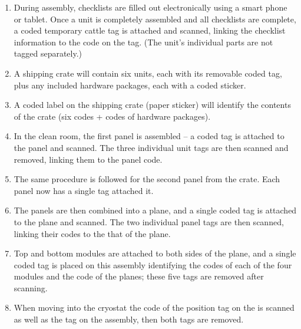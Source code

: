 \begin{enumerate}
\item During assembly,  checklists are filled out electronically using a smart phone or tablet.  Once a  unit 
is completely assembled and all checklists are complete, a coded temporary cattle tag is attached and scanned, linking the checklist information to the code on the tag. (The  unit's individual parts are not tagged separately.)
\item %
A shipping crate will contain six %
 units, each with its removable coded tag, plus any included hardware packages, each with a coded sticker.
\item A coded label on the shipping crate (paper sticker) will %
identify the contents of the crate (six codes + codes of hardware packages). 
\item In the \surf clean room, the first  panel is assembled -- a coded tag is attached to the  panel and scanned.  The three individual  unit tags are then scanned and removed, linking them to the  panel code.
\item The same procedure is followed for the second  panel from the crate.  Each  panel now has a single tag attached it.
\item The %
 panels are then combined into a  plane, and a single coded tag is attached to the  plane and scanned. %
The two individual  panel tags are then scanned, linking their codes to the that of the  plane. %
\item Top and bottom  modules 
are attached to both sides of the  plane, and  a single coded tag is placed on this  assembly identifying the codes of each of the four  modules %
and the code of the  planes;  %
these five tags are removed after scanning.  
\item When moving into the cryostat the code of the position tag on the  is scanned as well as the tag on the  assembly, then both tags %
are removed.
\end{enumerate}
